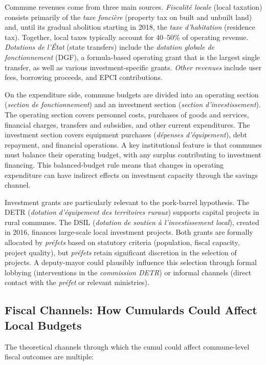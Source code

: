 \documentclass[12pt]{article}
\begin{document}
Commune revenues come from three main sources. \textit{Fiscalité locale} (local taxation) consists primarily of the \textit{taxe foncière} (property tax on built and unbuilt land) and, until its gradual abolition starting in 2018, the \textit{taxe d'habitation} (residence tax). Together, local taxes typically account for 40--50\% of operating revenue. \textit{Dotations de l'État} (state transfers) include the \textit{dotation globale de fonctionnement} (DGF), a formula-based operating grant that is the largest single transfer, as well as various investment-specific grants. \textit{Other revenues} include user fees, borrowing proceeds, and EPCI contributions.

On the expenditure side, commune budgets are divided into an operating section (\textit{section de fonctionnement}) and an investment section (\textit{section d'investissement}). The operating section covers personnel costs, purchases of goods and services, financial charges, transfers and subsidies, and other current expenditures. The investment section covers equipment purchases (\textit{dépenses d'équipement}), debt repayment, and financial operations. A key institutional feature is that communes must balance their operating budget, with any surplus contributing to investment financing. This balanced-budget rule means that changes in operating expenditure can have indirect effects on investment capacity through the savings channel.

Investment grants are particularly relevant to the pork-barrel hypothesis. The DETR (\textit{dotation d'équipement des territoires ruraux}) supports capital projects in rural communes. The DSIL (\textit{dotation de soutien à l'investissement local}), created in 2016, finances large-scale local investment projects. Both grants are formally allocated by \textit{préfets} based on statutory criteria (population, fiscal capacity, project quality), but \textit{préfets} retain significant discretion in the selection of projects. A deputy-mayor could plausibly influence this selection through formal lobbying (interventions in the \textit{commission DETR}) or informal channels (direct contact with the \textit{préfet} or relevant ministries).

\subsection{Fiscal Channels: How Cumulards Could Affect Local Budgets}

The theoretical channels through which the cumul could affect commune-level fiscal outcomes are multiple:
\end{document}
